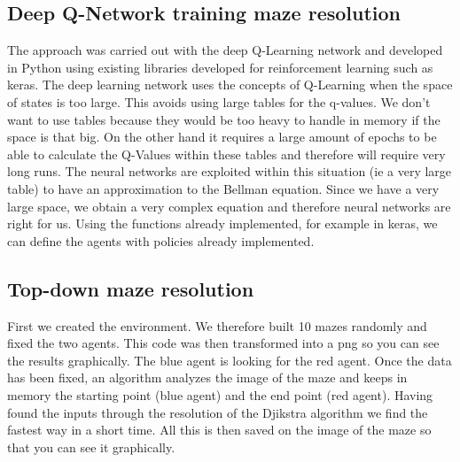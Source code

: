 \subsection{Deep Q-Network training maze resolution}
The approach was carried out with the deep Q-Learning network and developed in Python using existing libraries developed for reinforcement learning such as keras.
The deep learning network uses the concepts of Q-Learning when the space of states is too large. This avoids using large tables for the q-values. We don't want to 
use tables because they would be too heavy to handle in memory if the space is that big. On the other hand it requires a large amount of epochs to be able to calculate 
the Q-Values within these tables and therefore will require very long runs. The neural networks are exploited within this situation (ie a very large table) to have an 
approximation to the Bellman equation. Since we have a very large space, we obtain a very complex equation and therefore 
neural networks are right for us. Using the functions already implemented, for example in keras, we can define the agents with policies already implemented.

\subsection{Top-down maze resolution }
First we created the environment. We therefore built 10 mazes randomly and fixed the two agents. This code was then transformed into a png so you can see the results graphically.
The blue agent is looking for the red agent.
Once the data has been fixed, an algorithm analyzes the image of the maze and keeps in memory the starting point (blue agent) and the end point (red agent).
Having found the inputs through the resolution of the Djikstra algorithm we find the fastest way in a short time.
All this is then saved on the image of the maze so that you can see it graphically.
